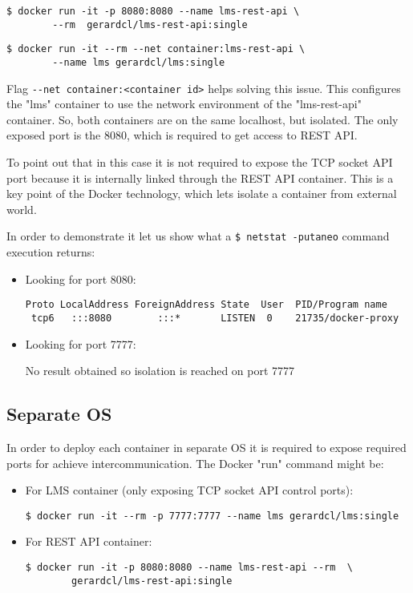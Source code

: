 \begin{verbatim}
$ docker run -it -p 8080:8080 --name lms-rest-api \
		--rm  gerardcl/lms-rest-api:single
\end{verbatim}
\begin{verbatim}
$ docker run -it --rm --net container:lms-rest-api \
		--name lms gerardcl/lms:single
\end{verbatim}

Flag \verb|--net container:<container id>| helps solving this issue. This configures the "lms" container to use the network environment of the "lms-rest-api" container. So, both containers are on the same localhost, but isolated. The only exposed port is the 8080, which is required to get access to REST API.

To point out that in this case it is not required to expose the TCP socket API port because it is internally linked through the REST API container. This is a key point of the Docker technology, which lets isolate a container from external world. 

In order to demonstrate it let us show what a \verb|$ netstat -putaneo| command  execution returns:
\begin{itemize}
\item Looking for port 8080: \hfill

\begin{verbatim}
Proto LocalAddress ForeignAddress State  User  PID/Program name 
 tcp6   :::8080        :::*       LISTEN  0    21735/docker-proxy
\end{verbatim}
\item Looking for port 7777: \hfill

No result obtained so isolation is reached on port 7777
\end{itemize}

\subsection{Separate OS}

In order to deploy each container in separate OS it is required to expose required ports for achieve intercommunication. The Docker "run" command might be:
\begin{itemize}
\item For LMS container (only exposing TCP socket API control ports): \hfill

\begin{verbatim}
$ docker run -it --rm -p 7777:7777 --name lms gerardcl/lms:single
\end{verbatim}
\item For REST API container: \hfill

\begin{verbatim}
$ docker run -it -p 8080:8080 --name lms-rest-api --rm  \
		gerardcl/lms-rest-api:single
\end{verbatim}
\end{itemize}

